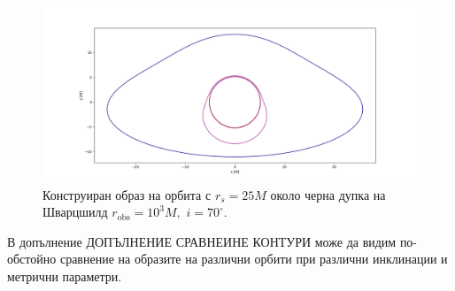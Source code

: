 \begin{figure}[h]
	\centering
	\includegraphics[scale = 0.3]{Schw_70_deg_r25.png}
	\caption[Конструиран образ на орбита с $r_s = 25M$ около черна дупка на Шварцшилд.]{\small Конструиран образ на орбита с $r_s = 25M$ около черна дупка на Шварцшилд $r_\text{obs} = 10^3M,\,\,i = 70^\circ$.} 
	\label{Scw_r25_orbit}
\end{figure}

В допълнение ДОПЪЛНЕНИЕ СРАВНЕИНЕ КОНТУРИ може да видим по-обстойно сравнение на образите на различни орбити при различни инклинации и метрични параметри.
\newpage

